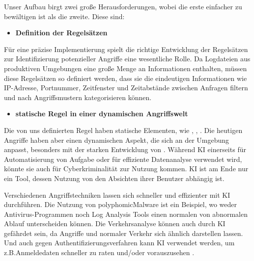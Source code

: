 
Unser Aufbau birgt zwei große Herausforderungen, wobei die erste einfacher zu bewältigen ist als die zweite. Diese sind:

\begin{itemize}[noitemsep]
    \item \textbf{Definition der Regelsätzen}
\end{itemize}


Für eine präzise Implementierung spielt die richtige Entwicklung der Regelsätzen zur Identifizierung potenzieller Angriffe eine wesentliche Rolle. Da Logdateien aus produktiven Umgebungen eine große Menge an Informationen enthalten, müssen diese Regelsätzen so definiert werden, dass sie die eindeutigen Informationen wie IP-Adresse, Portnummer, Zeitfenster und Zeitabstände zwischen Anfragen filtern und nach Angriffsmustern kategorisieren können.

\begin{itemize}[noitemsep]
    \item \textbf{statische Regel in einer dynamischen Angriffswelt}
\end{itemize}

Die von uns definierten Regel haben statische Elementen, wie , , . Die heutigen Angriffe haben aber einen dynamischen Aspekt, die sich an der Umgebung anpasst, besonders mit der starken Entwicklung von . Während \gls{KI} einerseits für Automatisierung von Aufgabe oder für effiziente Datenanalyse verwendet wird, könnte sie auch für Cyberkriminalität zur Nutzung kommen. \gls{KI} ist am Ende nur ein Tool, dessen Nutzung von den Absichten ihrer Benutzer abhängig ist.

Verschiedenen Angriffstechniken lassen sich schneller und effizienter mit \gls{KI} durchführen. Die Nutzung von \gls{polyphomicMalware} ist ein Beispiel, wo weder Antivirus-Programmen noch Log Analysis Tools einen normalen von abnormalen Ablauf unterscheiden können. Die Verkehrsanalyse können auch durch \gls{KI} gefährdet sein, da Angriffe und normaler Verkehr sich ähnlich darstellen lassen. Und auch gegen Authentifizierungsverfahren kann \gls{KI} verwendet werden, um z.B.Anmeldedaten schneller zu raten und/oder vorauszusehen \citep{Fritsch_AIcybersec}. 

